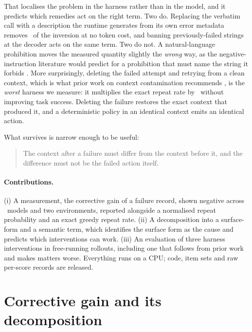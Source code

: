 That localises the problem in the harness rather than in the model, and it
predicts which remedies act on the right term. Two do. Replacing the verbatim
call with a description the runtime generates from its own error metadata
removes \AbstractRemoved\ of the inversion at no token cost, and banning
previously-failed strings at the decoder acts on the same term. Two do not. A
natural-language prohibition moves the measured quantity slightly the
\emph{wrong} way, as the negative-instruction literature would predict for a
prohibition that must name the string it forbids
\citep{castricato2024pinkelephants,negation2025pinkelephant}. More
surprisingly, deleting the failed attempt and retrying from a clean context,
which is what prior work on context contamination recommends
\citep{yang2026contamination}, is the \emph{worst} harness we measure: it
multiplies the exact repeat rate by \DropRepeatRatio\ without improving task
success. Deleting the failure restores the exact context that produced it, and
a deterministic policy in an identical context emits an identical action.

What survives is narrow enough to be useful:

\begin{quote}
The context after a failure must differ from the context before it, and the
difference must not be the failed action itself.
\end{quote}

\paragraph{Contributions.}
(i) A measurement, the corrective gain of a failure record, shown negative
across \NumModelsToolshed\ models and two environments, reported alongside a
normalised repeat probability and an exact greedy repeat rate.
(ii) A decomposition into a surface-form and a semantic term, which identifies
the surface form as the cause and predicts which interventions can work.
(iii) An evaluation of three harness interventions in free-running rollouts,
including one that follows from prior work and makes matters worse. Everything
runs on a CPU; code, item sets and raw per-score records are released.

\section{Corrective gain and its decomposition}
\label{sec:ws-gain}

